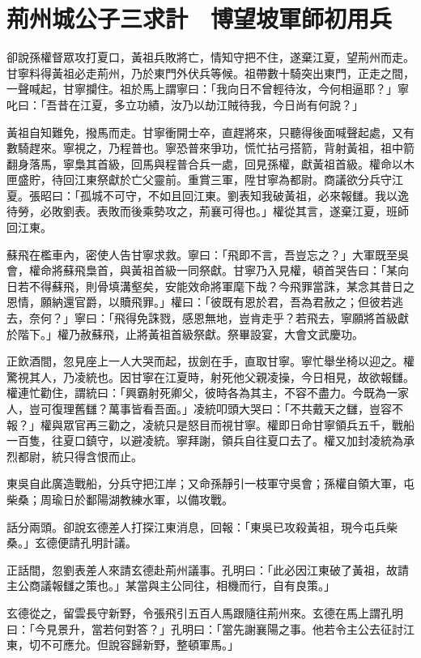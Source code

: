 
\chapter{荊州城公子三求計　博望坡軍師初用兵}

卻說孫權督眾攻打夏口，黃祖兵敗將亡，情知守把不住，遂棄江夏，望荊州而走。甘寧料得黃祖必走荊州，乃於東門外伏兵等候。祖帶數十騎突出東門，正走之間，一聲喊起，甘寧攔住。祖於馬上謂寧曰：「我向日不曾輕待汝，今何相逼耶？」寧叱曰：「吾昔在江夏，多立功績，汝乃以劫江賊待我，今日尚有何說？」

黃祖自知難免，撥馬而走。甘寧衝開士卒，直趕將來，只聽得後面喊聲起處，又有數騎趕來。寧視之，乃程普也。寧恐普來爭功，慌忙拈弓搭箭，背射黃祖，祖中箭翻身落馬，寧梟其首級，回馬與程普合兵一處，回見孫權，獻黃祖首級。權命以木匣盛貯，待回江東祭獻於亡父靈前。重賞三軍，陞甘寧為都尉。商議欲分兵守江夏。張昭曰：「孤城不可守，不如且回江東。劉表知我破黃祖，必來報讎。我以逸待勞，必敗劉表。表敗而後乘勢攻之，荊襄可得也。」權從其言，遂棄江夏，班師回江東。

蘇飛在檻車內，密使人告甘寧求救。寧曰：「飛即不言，吾豈忘之？」大軍既至吳會，權命將蘇飛梟首，與黃祖首級一同祭獻。甘寧乃入見權，頓首哭告曰：「某向日若不得蘇飛，則骨填溝壑矣，安能效命將軍麾下哉？今飛罪當誅，某念其昔日之恩情，願納還官爵，以贖飛罪。」權曰：「彼既有恩於君，吾為君赦之；但彼若逃去，奈何？」寧曰：「飛得免誅戮，感恩無地，豈肯走乎？若飛去，寧願將首級獻於階下。」權乃赦蘇飛，止將黃祖首級祭獻。祭畢設宴，大會文武慶功。

正飲酒間，忽見座上一人大哭而起，拔劍在手，直取甘寧。寧忙舉坐椅以迎之。權驚視其人，乃凌統也。因甘寧在江夏時，射死他父親凌操，今日相見，故欲報讎。權連忙勸住，謂統曰：「興霸射死卿父，彼時各為其主，不容不盡力。今既為一家人，豈可復理舊讎？萬事皆看吾面。」凌統叩頭大哭曰：「不共戴天之讎，豈容不報？」權與眾官再三勸之，凌統只是怒目而視甘寧。權即日命甘寧領兵五千，戰船一百隻，往夏口鎮守，以避凌統。寧拜謝，領兵自往夏口去了。權又加封凌統為承烈都尉，統只得含恨而止。

東吳自此廣造戰船，分兵守把江岸；又命孫靜引一枝軍守吳會；孫權自領大軍，屯柴桑；周瑜日於鄱陽湖教練水軍，以備攻戰。

話分兩頭。卻說玄德差人打探江東消息，回報：「東吳已攻殺黃祖，現今屯兵柴桑。」玄德便請孔明計議。

正話間，忽劉表差人來請玄德赴荊州議事。孔明曰：「此必因江東破了黃祖，故請主公商議報讎之策也。」某當與主公同往，相機而行，自有良策。」

玄德從之，留雲長守新野，令張飛引五百人馬跟隨往荊州來。玄德在馬上謂孔明曰：「今見景升，當若何對答？」孔明曰：「當先謝襄陽之事。他若令主公去征討江東，切不可應允。但說容歸新野，整頓軍馬。」

